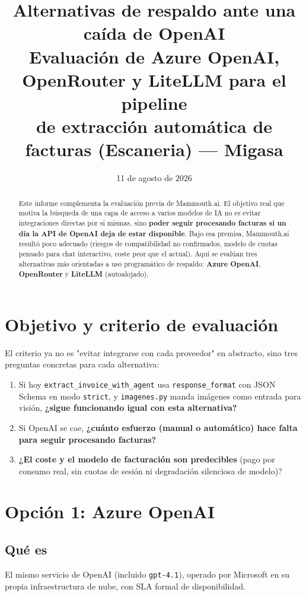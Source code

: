 \documentclass[11pt,a4paper]{article}
\title{\textbf{Alternativas de respaldo ante una caída de OpenAI}\\[0.3em]
\large Evaluación de Azure OpenAI, OpenRouter y LiteLLM para el pipeline\\
de extracción automática de facturas (Escaneria) --- Migasa}
\author{}
\date{11 de agosto de 2026}
\begin{document}
\maketitle
\thispagestyle{empty}

\begin{abstract}
\noindent
Este informe complementa la evaluación previa de Mammouth.ai. El objetivo real
que motiva la búsqueda de una capa de acceso a varios modelos de IA no es evitar
integraciones directas por sí mismas, sino \textbf{poder seguir procesando
facturas si un día la API de OpenAI deja de estar disponible}. Bajo esa premisa,
Mammouth.ai resultó poco adecuado (riesgos de compatibilidad no confirmados,
modelo de cuotas pensado para chat interactivo, coste peor que el actual). Aquí
se evalúan tres alternativas más orientadas a uso programático de respaldo:
\textbf{Azure OpenAI}, \textbf{OpenRouter} y \textbf{LiteLLM} (autoalojado).
\end{abstract}

\tableofcontents

\section{Objetivo y criterio de evaluación}

El criterio ya no es "evitar integrarse con cada proveedor" en abstracto, sino
tres preguntas concretas para cada alternativa:

\begin{enumerate}
    \item Si hoy \texttt{extract\_invoice\_with\_agent} usa
    \texttt{response\_format} con JSON Schema en modo \texttt{strict}, y
    \texttt{imagenes.py} manda imágenes como entrada para visión,
    \textbf{¿sigue funcionando igual con esta alternativa?}
    \item Si OpenAI se cae, \textbf{¿cuánto esfuerzo (manual o automático) hace
    falta para seguir procesando facturas?}
    \item \textbf{¿El coste y el modelo de facturación son predecibles} (pago por
    consumo real, sin cuotas de sesión ni degradación silenciosa de modelo)?
\end{enumerate}

\section{Opción 1: Azure OpenAI}

\subsection{Qué es}
El mismo servicio de OpenAI (incluido \texttt{gpt-4.1}), operado por Microsoft en
su propia infraestructura de nube, con SLA formal de disponibilidad.
\end{document}
